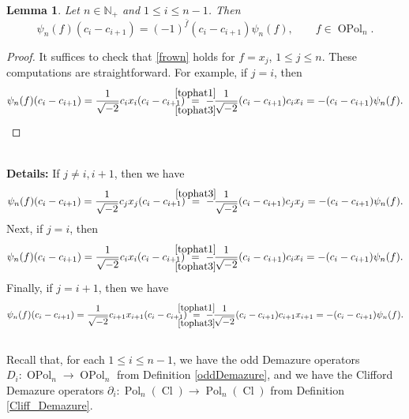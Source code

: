\documentclass[11pt]{amsart}
\newcommand{\details}[1]{
      \ \\
      {\color{OliveGreen}
        \textbf{Details:} #1
      }
      \\
  }
\newcommand{\details}[1]{}
\newtheorem{lem}[theo]{Lemma}
\theoremstyle{definition}
\numberwithin{equation}{section}
\begin{document}
\begin{lem}
Let $ n \in \mathbb{N}_{+} $ and $ 1 \leq i \leq n-1 $. Then 
\begin{equation} \label{frown}
\psi_{n}(f)(c_{i}-c_{i+1}) = (-1)^{\bar{f}}(c_{i}-c_{i+1})\psi_{n}(f), \qquad f \in \operatorname{OPol}_{n}.
\end{equation}
\end{lem}

\begin{proof}
It suffices to check that \cref{frown} holds for $ f = x_{j} $, $ 1 \leq j \leq n $. These computations are straightforward. For example, if $ j = i $, then
\begin{equation*}
\psi_{n}(f)(c_{i}-c_{i+1}) = \frac{1}{\sqrt{-2}}c_{i}x_{i}(c_{i}-c_{i+1}) \ \overset{\mathclap{\cref{tophat1}}}{\underset{\mathclap{\cref{tophat3}}}{=}} \ -\frac{1}{\sqrt{-2}}(c_{i}-c_{i+1})c_{i}x_{i} = -(c_{i}-c_{i+1})\psi_{n}(f). \qedhere
\end{equation*}
\end{proof}

\details{If $ j \neq i,i+1 $, then we have 
\begin{equation*}
\psi_{n}(f)(c_{i}-c_{i+1}) = \frac{1}{\sqrt{-2}}c_{j}x_{j}(c_{i}-c_{i+1}) \ \stackrel{\mathclap{\cref{tophat3}}}{=} \ -\frac{1}{\sqrt{-2}}(c_{i}-c_{i+1})c_{j}x_{j} = -(c_{i}-c_{i+1})\psi_{n}(f).
\end{equation*}
Next, if $ j = i $, then
\begin{equation*}
\psi_{n}(f)(c_{i}-c_{i+1}) = \frac{1}{\sqrt{-2}}c_{i}x_{i}(c_{i}-c_{i+1}) \ \overset{\mathclap{\cref{tophat1}}}{\underset{\mathclap{\cref{tophat3}}}{=}} \ -\frac{1}{\sqrt{-2}}(c_{i}-c_{i+1})c_{i}x_{i} = -(c_{i}-c_{i+1})\psi_{n}(f).
\end{equation*}
Finally, if $ j = i+1 $, then we have
\begin{equation*}
\psi_{n}(f)(c_{i}-c_{i+1}) = \frac{1}{\sqrt{-2}}c_{i+1}x_{i+1}(c_{i}-c_{i+1}) \ \overset{\mathclap{\cref{tophat1}}}{\underset{\mathclap{\cref{tophat3}}}{=}} \ -\frac{1}{\sqrt{-2}}(c_{i}-c_{i+1})c_{i+1}x_{i+1} = -(c_{i}-c_{i+1})\psi_{n}(f).
\end{equation*}}



Recall that, for each $ 1 \leq i \leq n-1 $, we have the odd Demazure operators $ D_{i} \colon \operatorname{OPol}_{n} \rightarrow \operatorname{OPol}_{n} $ from Definition \ref{oddDemazure}, and we have the Clifford Demazure operators $ \partial_{i} \colon \operatorname{Pol}_{n}(\operatorname{Cl}) \rightarrow \operatorname{Pol}_{n}(\operatorname{Cl}) $ from Definition \ref{Cliff_Demazure}. 
\end{document}
